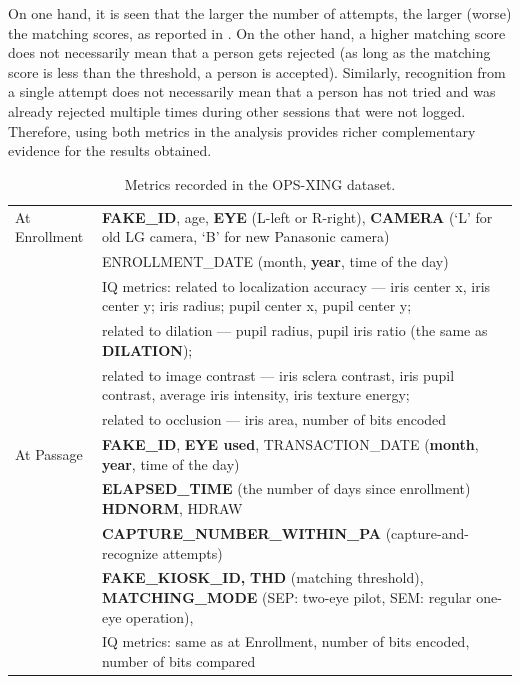\documentclass{cta-author}%
\begin{document}
On one hand, it is seen that the larger the number of attempts, the larger (worse) the matching scores, as reported in \cite{Bowyer-attempts}.
On the other hand, a higher matching score does not necessarily mean that a person gets rejected (as long as the matching score is less than the threshold, a person is accepted). Similarly, recognition from a single attempt does not necessarily mean that a person has not tried and was already rejected multiple times during other sessions that were not logged. 
Therefore, using both metrics in the analysis  provides richer complementary evidence for the results obtained.



\begin{table}[!t]
	\caption{Metrics recorded in the OPS-XING dataset. 	
	\label{MetricsRecordedAtOPSXINGDataSet}}


\begin{small}

		\begin{tabular} { l | l }
		\hline
			At Enrollment & 
			\textbf{FAKE\_ID}, age, %
\textbf{EYE} (L-left or R-right), 
\textbf{CAMERA }(`L' for old LG camera, `B' for new Panasonic camera) \\ 
& ENROLLMENT\_DATE (month, \textbf{year}, time of the day)
\\ 
& IQ metrics:  related to localization accuracy --- 
			iris center x,   iris center y; 			 iris radius; 	pupil center x,  pupil center y; 
			\\ 			& 
\quad related to dilation ---  
pupil radius,   
pupil iris ratio  (the same as \textbf{DILATION});		
			\\ 			& 		
\quad related to image contrast --- 
iris sclera contrast,
	iris pupil contrast, 
	average iris intensity, 
	iris texture energy;    
			\\ 			& 
\quad related to  occlusion --- 
iris area,     
	number of bits encoded   
\\ \hline
				At Passage & 
				\textbf{FAKE\_ID},
\textbf{EYE used},
TRANSACTION\_DATE (\textbf{month}, \textbf{year}, time of the day) \\ 			& 
\textbf{ELAPSED\_TIME} (the number of days since enrollment) 
\textbf{HDNORM}, HDRAW 
		\\ 			& 
\textbf{CAPTURE\_NUMBER\_WITHIN\_PA} (capture-and-recognize attempts)
			\\ 			& 
\textbf{FAKE\_KIOSK\_ID,}
\textbf{THD} (matching threshold), 	
\textbf{MATCHING\_MODE} (SEP: two-eye pilot, SEM: regular one-eye operation), 
							\\ 			& 
				IQ metrics: same as at Enrollment,
				number of bits encoded, number of bits compared 
				\\	
				\hline
		\end{tabular}


\end{small}
\end{table}
\end{document}
